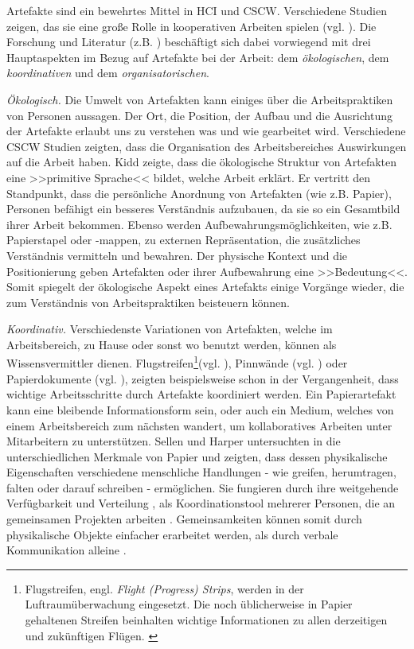 \medskip Artefakte sind ein bewehrtes Mittel in \ac{HCI} und \ac{CSCW}. Verschiedene Studien zeigen, das sie eine große Rolle in kooperativen Arbeiten spielen (vgl. \citealp{Bardram:2005, Heath:1992, Hutchins:1995, Robinson:1993, Schmidt:2002, Sellen:2003, Shapiro:1994, Vyas:2008}). Die Forschung und Literatur (z.B. \citealp{Randall:2007}) beschäftigt sich dabei vorwiegend mit drei Hauptaspekten im Bezug auf Artefakte bei der Arbeit: dem \emph{ökologischen}, dem \emph{koordinativen} und dem \emph{organisatorischen}.

\medskip \emph{Ökologisch.} Die Umwelt von Artefakten kann einiges über die Arbeitspraktiken von Personen aussagen. Der Ort, die Position, der Aufbau und die Ausrichtung der Artefakte erlaubt uns zu verstehen was und wie gearbeitet wird. Verschiedene \ac{CSCW} Studien \citep{Heath:1992, Sellen:2003} zeigten, dass die Organisation des Arbeitsbereiches Auswirkungen auf die Arbeit haben. Kidd \citep{Kidd:1994} zeigte, dass die ökologische Struktur von Artefakten eine >>primitive Sprache<< bildet, welche Arbeit erklärt. Er vertritt den Standpunkt, dass die persönliche Anordnung von Artefakten (wie z.B. Papier), Personen befähigt ein besseres Verständnis aufzubauen, da sie so ein Gesamtbild ihrer Arbeit bekommen. Ebenso werden Aufbewahrungsmöglichkeiten, wie z.B. Papierstapel oder -mappen, zu externen Repräsentation, die zusätzliches Verständnis vermitteln und bewahren. Der physische Kontext und die Positionierung geben Artefakten oder ihrer Aufbewahrung eine >>Bedeutung<<. Somit spiegelt der ökologische Aspekt eines Artefakts einige Vorgänge wieder, die zum Verständnis von Arbeitspraktiken beisteuern können.

\medskip \emph{Koordinativ.} Verschiedenste Variationen von Artefakten, welche im Arbeitsbereich, zu Hause oder sonst wo benutzt werden, können als Wissensvermittler dienen. Flugstreifen\footnote{Flugstreifen, engl. \emph{Flight (Progress) Strips}, werden in der Luftraumüberwachung eingesetzt. Die noch üblicherweise in Papier gehaltenen Streifen beinhalten wichtige Informationen zu allen derzeitigen und zukünftigen Flügen. \citep{Bentley:1992}}(vgl. \citealp{Shapiro:1994}), Pinnwände (vgl. \citealp{Bardram:2005}) oder Papierdokumente (vgl. \citealp{Sellen:2003}), zeigten beispielsweise schon in der Vergangenheit, dass wichtige Arbeitsschritte durch Artefakte koordiniert werden. Ein Papierartefakt kann eine bleibende Informationsform sein, oder auch ein Medium, welches von einem Arbeitsbereich zum nächsten wandert, um kollaboratives Arbeiten unter Mitarbeitern zu unterstützen. Sellen und Harper untersuchten in \citep{Sellen:2003} die unterschiedlichen Merkmale von Papier und zeigten, dass dessen physikalische Eigenschaften verschiedene menschliche Handlungen - wie greifen, herumtragen, falten oder darauf schreiben - ermöglichen. Sie fungieren durch ihre weitgehende Verfügbarkeit \citep{Heath:1992} und Verteilung \citep{Robinson:1993}, als Koordinationstool mehrerer Personen, die an gemeinsamen Projekten arbeiten \citep{Vyas:2008}. Gemeinsamkeiten können somit durch physikalische Objekte einfacher erarbeitet werden, als durch verbale Kommunikation alleine \citep{Larsson:2003}.

